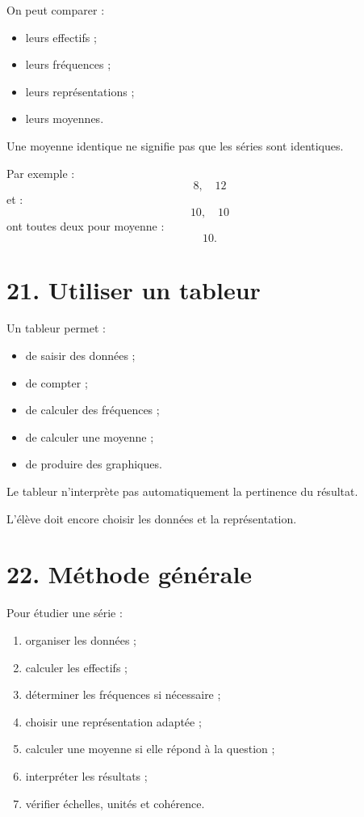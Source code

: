 On peut comparer :
\begin{itemize}
\item leurs effectifs ;
\item leurs fréquences ;
\item leurs représentations ;
\item leurs moyennes.
\end{itemize}

Une moyenne identique ne signifie pas que les séries sont identiques.

Par exemple :
\[
8,\quad12
\]
et :
\[
10,\quad10
\]
ont toutes deux pour moyenne :
\[
10.
\]

\section{21. Utiliser un tableur}

Un tableur permet :
\begin{itemize}
\item de saisir des données ;
\item de compter ;
\item de calculer des fréquences ;
\item de calculer une moyenne ;
\item de produire des graphiques.
\end{itemize}

Le tableur n'interprète pas automatiquement la pertinence du résultat.

L'élève doit encore choisir les données et la représentation.

\section{22. Méthode générale}

\begin{methode}
Pour étudier une série :
\begin{enumerate}
\item organiser les données ;
\item calculer les effectifs ;
\item déterminer les fréquences si nécessaire ;
\item choisir une représentation adaptée ;
\item calculer une moyenne si elle répond à la question ;
\item interpréter les résultats ;
\item vérifier échelles, unités et cohérence.
\end{enumerate}
\end{methode}

